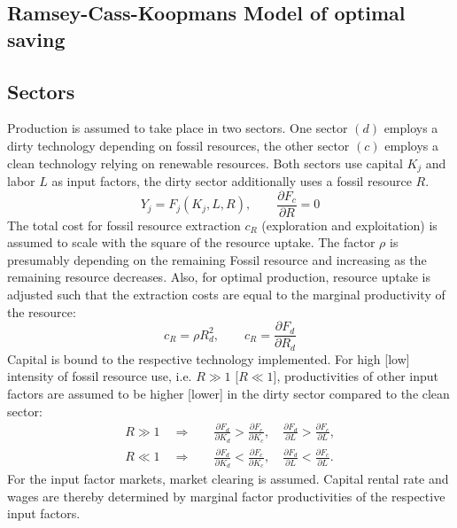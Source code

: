 \subsection{Ramsey-Cass-Koopmans Model of optimal saving}


\subsection{Sectors}

Production is assumed to take place in two sectors. One sector $(d)$ employs a dirty technology depending on fossil resources, the other sector $(c)$ employs a clean technology relying on renewable resources. Both sectors use capital $K_j$ and labor $L$ as input factors, the dirty sector additionally uses a fossil resource $R$.
\begin{equation}
	Y_j = F_j(K_j,L,R), \qquad \frac{\partial F_c}{\partial R} = 0 	
	\label{eq:production}
\end{equation}
The total cost for fossil resource extraction $c_R$ (exploration and exploitation) is assumed to scale with the square of the resource uptake. The factor $\rho$ is presumably depending on the remaining Fossil resource and increasing as the remaining resource decreases. Also, for optimal production, resource uptake is adjusted such that the extraction costs are equal to the marginal productivity of the resource:
\begin{equation}
	c_R = \rho R_{d}^{2}, \qquad c_R = \frac{\partial F_d}{\partial R_d}
	\label{resource_extraction_cost}
\end{equation}
Capital is bound to the respective technology implemented. For high [low] intensity of fossil resource use, i.e. $R \gg 1$ [$R \ll 1$], productivities of other input factors are assumed to be higher [lower] in the dirty sector compared to the clean sector:
\begin{align}
	R \gg 1 \quad \Rightarrow & \quad \frac{\partial F_d}{\partial K_d} > \frac{\partial F_c}{ \partial K_c}, \quad \frac{\partial F_d}{\partial L} > \frac{\partial F_c}{ \partial L}, \\
	R \ll 1 \quad \Rightarrow & \quad \frac{\partial F_d}{\partial K_d} < \frac{\partial F_c}{ \partial K_c}, \quad \frac{\partial F_d}{\partial L} < \frac{\partial F_c}{ \partial L}.
	\label{eq:input_factor_productivities}
\end{align}
For the input factor markets, market clearing is assumed. Capital rental rate and wages are thereby determined by marginal factor productivities of the respective input factors.
